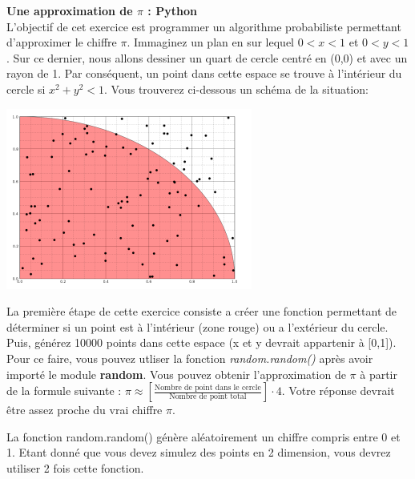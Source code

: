 \begin{Exercice}[20 minutes]\textbf{Une approximation de $\pi$ : Python}\\
L'objectif de cet exercice est programmer un algorithme probabiliste permettant d'approximer le chiffre $\pi$. Immaginez un plan en sur lequel $0 < x < 1$ et $0 < y < 1$. Sur ce dernier, nous allons dessiner un quart de cercle centré en (0,0) et avec un rayon de 1. Par conséquent, un point dans cette espace se trouve à l'intérieur du cercle si $x^2 + y^2 < 1$. Vous trouverez ci-dessous un schéma de la situation:
\begin{center}
\includegraphics[]{Cercle.PNG}
\end{center}
La première étape de cette exercice consiste a créer une fonction permettant de déterminer si un point est à l'intérieur (zone rouge) ou a l'extérieur du cercle. Puis, générez 10000 points dans cette espace (x et y devrait appartenir à [0,1]). Pour ce faire, vous pouvez utliser la fonction \textit{random.random()} après avoir importé le module \textbf{random}. Vous pouvez obtenir l'approximation de $\pi$ à partir de la formule suivante : $\pi \approx [\frac{\text{Nombre de point dans le cercle}}{\text{Nombre de point total}}]\cdot 4$. Votre réponse devrait être assez proche du vrai chiffre $\pi$.\\
\begin{conseil}
    La fonction random.random() génère aléatoirement un chiffre compris entre 0 et 1. Etant donné que vous devez simulez des points en 2 dimension, vous devrez utiliser 2 fois cette fonction.
\end{conseil}
\begin{solution}
 
\end{solution}

\end{Exercice}

